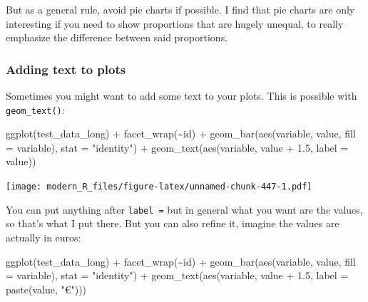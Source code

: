 \documentclass[
]{article}
\newenvironment{Shaded}{\begin{snugshade}}{\end{snugshade}}
\newcommand{\AttributeTok}[1]{\textcolor[rgb]{0.77,0.63,0.00}{#1}}
\newcommand{\FloatTok}[1]{\textcolor[rgb]{0.00,0.00,0.81}{#1}}
\newcommand{\FunctionTok}[1]{\textcolor[rgb]{0.00,0.00,0.00}{#1}}
\newcommand{\NormalTok}[1]{#1}
\newcommand{\SpecialCharTok}[1]{\textcolor[rgb]{0.00,0.00,0.00}{#1}}
\newcommand{\StringTok}[1]{\textcolor[rgb]{0.31,0.60,0.02}{#1}}
\begin{document}
But as a general rule, avoid pie charts if possible. I find that pie charts are only interesting if
you need to show proportions that are hugely unequal, to really emphasize the difference between
said proportions.

\hypertarget{adding-text-to-plots}{%
\subsubsection{Adding text to plots}\label{adding-text-to-plots}}

Sometimes you might want to add some text to your plots. This is possible with \texttt{geom\_text()}:

\begin{Shaded}
\begin{Highlighting}[]
\FunctionTok{ggplot}\NormalTok{(test\_data\_long) }\SpecialCharTok{+}
  \FunctionTok{facet\_wrap}\NormalTok{(}\SpecialCharTok{\textasciitilde{}}\NormalTok{id) }\SpecialCharTok{+}
  \FunctionTok{geom\_bar}\NormalTok{(}\FunctionTok{aes}\NormalTok{(variable, value, }\AttributeTok{fill =}\NormalTok{ variable), }\AttributeTok{stat =} \StringTok{"identity"}\NormalTok{) }\SpecialCharTok{+}
  \FunctionTok{geom\_text}\NormalTok{(}\FunctionTok{aes}\NormalTok{(variable, value }\SpecialCharTok{+} \FloatTok{1.5}\NormalTok{, }\AttributeTok{label =}\NormalTok{ value))}
\end{Highlighting}
\end{Shaded}

\texttt{[image: modern\_R\_files/figure-latex/unnamed-chunk-447-1.pdf]}

You can put anything after \texttt{label\ =} but in general what you want are the values, so that's what
I put there. But you can also refine it, imagine the values are actually in euros:

\begin{Shaded}
\begin{Highlighting}[]
\FunctionTok{ggplot}\NormalTok{(test\_data\_long) }\SpecialCharTok{+}
  \FunctionTok{facet\_wrap}\NormalTok{(}\SpecialCharTok{\textasciitilde{}}\NormalTok{id) }\SpecialCharTok{+}
  \FunctionTok{geom\_bar}\NormalTok{(}\FunctionTok{aes}\NormalTok{(variable, value, }\AttributeTok{fill =}\NormalTok{ variable), }\AttributeTok{stat =} \StringTok{"identity"}\NormalTok{) }\SpecialCharTok{+}
  \FunctionTok{geom\_text}\NormalTok{(}\FunctionTok{aes}\NormalTok{(variable, value }\SpecialCharTok{+} \FloatTok{1.5}\NormalTok{, }\AttributeTok{label =} \FunctionTok{paste}\NormalTok{(value, }\StringTok{"€"}\NormalTok{)))}
\end{Highlighting}
\end{Shaded}
\end{document}
